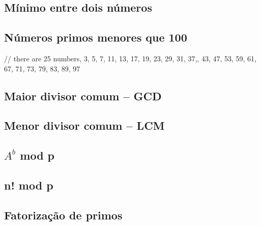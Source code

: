 \documentclass[a4paper,12pt]{article}
\begin{document}

\subsection{Mínimo entre dois números}


\subsection{Números primos menores que 100}

// there are 25 numbers, 3, 5, 7, 11, 13, 17, 19, 23, 29, 31, 37,, 43, 47, 53, 59, 61, 67, 71, 73, 79, 83, 89, 97

\subsection{Maior divisor comum – GCD}


\subsection{Menor divisor comum – LCM}


\subsection{$A^b$ mod p}


\subsection{n! mod p}


\subsection{Fatorização de primos}



\newpage
\end{document}
